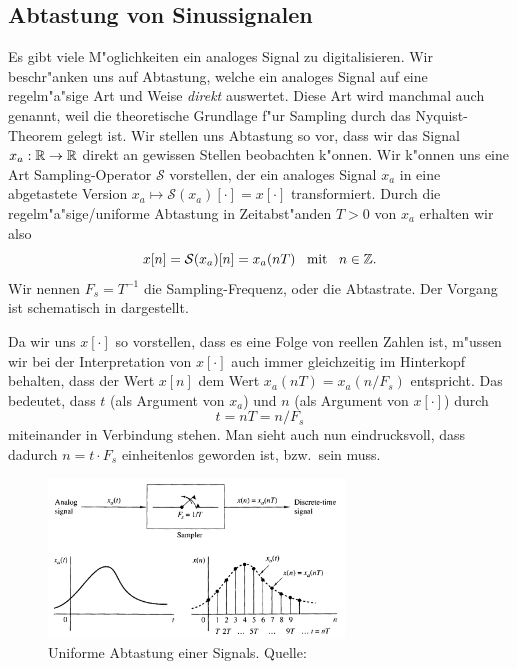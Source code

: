 \subsection{Abtastung von Sinussignalen}\label{sec:sample_harm}
%
Es gibt viele M"oglichkeiten ein analoges Signal zu digitalisieren.
Wir beschr"anken uns auf Abtastung, welche ein analoges Signal auf eine regelm"a"sige Art und Weise \emph{direkt} auswertet.
Diese Art wird manchmal auch  genannt, weil die theoretische Grundlage f"ur  Sampling durch das Nyquist-Theorem gelegt ist.
Wir stellen uns Abtastung so vor, dass wir das Signal $x_a: \mathbb{R} \rightarrow \mathbb{R}$ direkt an gewissen Stellen beobachten k"onnen.
Wir k"onnen uns eine Art Sampling-Operator $\mathcal{S}$ vorstellen, der ein analoges Signal $x_a$ in eine abgetastete Version $x_a \mapsto \mathcal{S}(x_a)[\cdot] = x[\cdot]$ transformiert.
Durch die regelm"a"sige/uniforme Abtastung in Zeitabst"anden $T > 0$ von $x_a$ erhalten wir also
\[
    x[n] = \mathcal{S}(x_a)[n] = x_a(n T) {\hspace{3mm} \text{mit} \hspace{3mm}} n \in \mathbb{Z}.
\]
Wir nennen $F_s = T^{-1}$ die Sampling-Frequenz, oder die Abtastrate.
Der Vorgang ist schematisch in  dargestellt.

Da wir uns $x[\cdot]$ so vorstellen, dass es  eine Folge von reellen Zahlen ist, m"ussen wir bei der Interpretation von $x[\cdot]$ auch immer gleichzeitig im Hinterkopf behalten, dass der Wert $x[n]$ dem Wert $x_a(n T) = x_a(n/F_s)$ entspricht.
Das bedeutet, dass $t$ (als Argument von $x_a$) und $n$ (als Argument von $x[\cdot]$) durch
\[
t = n T = n/F_s
\]
miteinander in Verbindung stehen. 
Man sieht auch nun eindrucksvoll, dass dadurch $n = t \cdot F_s$ einheitenlos geworden ist, bzw.~sein muss.
%
\begin{figure}
    \begin{center}
        \includegraphics[width=0.7\textwidth]{img/sampling/uniform_sampling.png}
    \end{center}
    \caption{Uniforme Abtastung einer Signals. Quelle: \cite{proakis2013}}\label{fig:uniform_sampling}
\end{figure}

